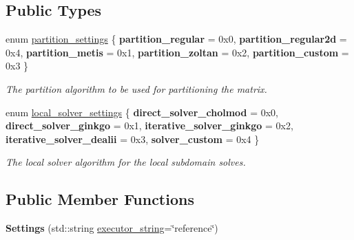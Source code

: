 \subsection*{Public Types}
\begin{DoxyCompactItemize}
\item 
\mbox{\label{structSchwarzWrappers_1_1Settings_a5b3a60043fc866039d760e5357c17f6d}} 
enum \hyperlink{structSchwarzWrappers_1_1Settings_a5b3a60043fc866039d760e5357c17f6d}{partition\+\_\+settings} \{ \newline
{\bfseries partition\+\_\+regular} = 0x0, 
{\bfseries partition\+\_\+regular2d} = 0x4, 
{\bfseries partition\+\_\+metis} = 0x1, 
{\bfseries partition\+\_\+zoltan} = 0x2, 
\newline
{\bfseries partition\+\_\+custom} = 0x3
 \}\begin{DoxyCompactList}\small\item\em The partition algorithm to be used for partitioning the matrix. \end{DoxyCompactList}
\item 
\mbox{\label{structSchwarzWrappers_1_1Settings_abb00a70a7c715c93a2e7570ad6dc1bbe}} 
enum \hyperlink{structSchwarzWrappers_1_1Settings_abb00a70a7c715c93a2e7570ad6dc1bbe}{local\+\_\+solver\+\_\+settings} \{ \newline
{\bfseries direct\+\_\+solver\+\_\+cholmod} = 0x0, 
{\bfseries direct\+\_\+solver\+\_\+ginkgo} = 0x1, 
{\bfseries iterative\+\_\+solver\+\_\+ginkgo} = 0x2, 
{\bfseries iterative\+\_\+solver\+\_\+dealii} = 0x3, 
\newline
{\bfseries solver\+\_\+custom} = 0x4
 \}\begin{DoxyCompactList}\small\item\em The local solver algorithm for the local subdomain solves. \end{DoxyCompactList}
\end{DoxyCompactItemize}
\subsection*{Public Member Functions}
\begin{DoxyCompactItemize}
\item 
\mbox{\label{structSchwarzWrappers_1_1Settings_a72edc489ebfe5ad7e8c2bb8424860f2a}} 
{\bfseries Settings} (std\+::string \hyperlink{structSchwarzWrappers_1_1Settings_a737e5de9833ab6f27606103b907ec06e}{executor\+\_\+string}=\char`\"{}reference\char`\"{})
\end{DoxyCompactItemize}
